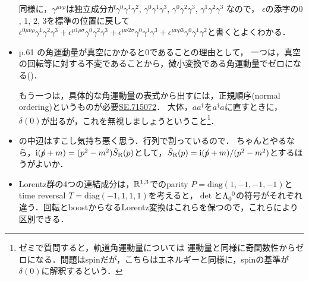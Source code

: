 \begin{itemize}
		同様に，$\gamma^{\mu\nu\rho}$は独立成分が$\gamma^{0}\gamma^{1}\gamma^{2}$, $\gamma^{0}\gamma^{1}\gamma^{3}$, $\gamma^{0}\gamma^{2}\gamma^{3}$, $\gamma^{1}\gamma^{2}\gamma^{3}$
		なので，
		$\epsilon$の添字の$0$, $1$, $2$, $3$を標準の位置に戻して$\epsilon^{0\mu\nu\rho}\gamma^{1}\gamma^{2}\gamma^{3} + \epsilon^{\mu1\rho\sigma}\gamma^{0}\gamma^{2}\gamma^{3} + \epsilon^{\mu\nu2\sigma}\gamma^{0}\gamma^{1}\gamma^{3} + \epsilon^{\mu\nu\rho3}\gamma^{0}\gamma^{1}\gamma^{2}$と書くとよくわかる．



	\item p.61 の角運動量が真空にかかると$0$であることの理由として，
		一つは，真空の回転等に対する不変であることから，微小変換である角運動量でゼロになる(\cite[p.323]{Sakamoto2014})．

		もう一つは，具体的な角運動量の表式から出すには，正規順序(normal ordering)というものが必要\href{https://physics.stackexchange.com/a/715148}{SE.715072}．
		大体，$aa^{\dag}$を$a^{\dag}a$に直すときに，$\delta(0)$が出るが，これを無視しましょうということ\footnote{ゼミで質問すると，軌道角運動量については
		運動量と同様に奇関数性からゼロになる．問題はspinだが，こちらはエネルギーと同様に，spinの基準が$\delta(0)$に解釈するという．}．
	\item {}の中辺はすこし気持ち悪く思う．行列で割っているので．
		ちゃんとやるなら，$\mathrm{i} (p\!\!\!/ + m) = (p^2 - m^2) \tilde{S}_{\text{R}}(p)$として，$\tilde{S}_{\text{R}}(p) = \mathrm{i}(p\!\!\!/ + m)/(p^2-m^2) $とするほうがよいか．

	\item Lorentz群の4つの連結成分は，$\mathbb{R}^{1, 3}$でのparity $P = \mathrm{diag}(1, -1, -1, -1)$とtime reversal $T = \mathrm{diag}(-1, 1, 1,1)$を考えると，$\det$と$\Lambda\indices{_0^0}$の符号がそれぞれ違う．回転とboostからなるLorentz変換はこれらを保つので，これらにより区別できる．


\end{itemize}
